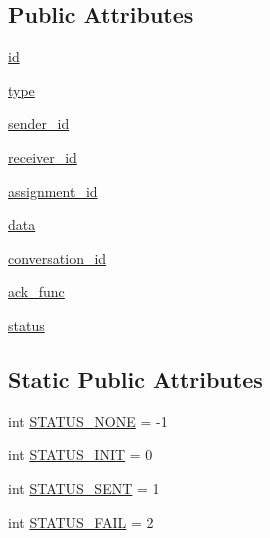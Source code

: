 \subsection*{Public Attributes}
\begin{DoxyCompactItemize}
\item 
\hyperlink{classparlai_1_1mturk_1_1core_1_1dev_1_1socket__manager_1_1Packet_a451091aed811f2901c213986fc86d020}{id}
\item 
\hyperlink{classparlai_1_1mturk_1_1core_1_1dev_1_1socket__manager_1_1Packet_acc5963f125182087b623a3adde523c89}{type}
\item 
\hyperlink{classparlai_1_1mturk_1_1core_1_1dev_1_1socket__manager_1_1Packet_a3095d75963017368974bd34c3aacfe8c}{sender\+\_\+id}
\item 
\hyperlink{classparlai_1_1mturk_1_1core_1_1dev_1_1socket__manager_1_1Packet_af453648a5280b925750d4305dcd2404a}{receiver\+\_\+id}
\item 
\hyperlink{classparlai_1_1mturk_1_1core_1_1dev_1_1socket__manager_1_1Packet_ae1819bd7ee66a1e798fbfd091ebf060e}{assignment\+\_\+id}
\item 
\hyperlink{classparlai_1_1mturk_1_1core_1_1dev_1_1socket__manager_1_1Packet_a55eb8eaaff74df589a544a1133434bac}{data}
\item 
\hyperlink{classparlai_1_1mturk_1_1core_1_1dev_1_1socket__manager_1_1Packet_a4214fa53d6892dbfaa37cf6e3503f945}{conversation\+\_\+id}
\item 
\hyperlink{classparlai_1_1mturk_1_1core_1_1dev_1_1socket__manager_1_1Packet_a8a1db141ef73f663d032aa493825b4a2}{ack\+\_\+func}
\item 
\hyperlink{classparlai_1_1mturk_1_1core_1_1dev_1_1socket__manager_1_1Packet_a322b2711fac3332dc676f1d7d3b04a35}{status}
\end{DoxyCompactItemize}
\subsection*{Static Public Attributes}
\begin{DoxyCompactItemize}
\item 
int \hyperlink{classparlai_1_1mturk_1_1core_1_1dev_1_1socket__manager_1_1Packet_a60677f9d24105044a0e25c41306178d6}{S\+T\+A\+T\+U\+S\+\_\+\+N\+O\+NE} = -\/1
\item 
int \hyperlink{classparlai_1_1mturk_1_1core_1_1dev_1_1socket__manager_1_1Packet_a2129bbc0a0427bee81b6f6565a6fc7b9}{S\+T\+A\+T\+U\+S\+\_\+\+I\+N\+IT} = 0
\item 
int \hyperlink{classparlai_1_1mturk_1_1core_1_1dev_1_1socket__manager_1_1Packet_ad6abd9f036228935ef6e04d1fa4943e2}{S\+T\+A\+T\+U\+S\+\_\+\+S\+E\+NT} = 1
\item 
int \hyperlink{classparlai_1_1mturk_1_1core_1_1dev_1_1socket__manager_1_1Packet_a559b39e98b8b986d7beafd09a04b5c1c}{S\+T\+A\+T\+U\+S\+\_\+\+F\+A\+IL} = 2
\end{DoxyCompactItemize}


